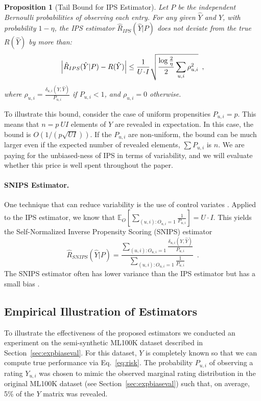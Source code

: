 \documentclass{article}
\newtheorem{proposition}[theorem]{Proposition}
\def\E{{\mathbb{E}}}
\newcommand{\user}{u}                       %
\newcommand{\users}{U}                      %
\newcommand{\movie}{i}                      %
\newcommand{\movies}{I}                     %
\newcommand{\ytrue}{Y}                      %
\newcommand{\ytrueelem}[1]{\ytrue_{#1}}
\newcommand{\ytrueum}{\ytrueelem{\user,\movie}}
\newcommand{\ypred}{\hat{Y}}                %
\newcommand{\loss}[3]{\delta_{#1}(#2,#3)}   %
\newcommand{\lossum}{\loss{\user,\movie}{\ytrue}{\ypred}}
\newcommand{\obs}{O}                        %
\newcommand{\obselem}[1]{\obs_{#1}}
\newcommand{\obsum}{\obselem{\user,\movie}}
\newcommand{\probobs}{P}                    %
\newcommand{\probobselem}[1]{\probobs_{#1}}
\newcommand{\probobsum}{\probobselem{\user,\movie}}
\newcommand{\risk}[1]{R(#1)}                %
\newcommand{\risky}{\risk{\ypred}}
\newcommand{\ipsest}[2]{\hat{R}_{IPS}(#1|#2)}      %
\newcommand{\ipsesty}{\ipsest{\ypred}{\probobs}}
\newcommand{\snipsest}[2]{\hat{R}_{SNIPS}(#1|#2)}  %
\newcommand{\snipsesty}{\snipsest{\ypred}{\probobs}}
\begin{document}
\begin{proposition}[Tail Bound for IPS Estimator]\label{thm:tailbound}
Let $P$ be the independent Bernoulli probabilities of observing each entry. For any given $\ypred$ and $\ytrue$, with probability $1-\eta$, the IPS estimator $\ipsesty$ does not deviate from the true $R(\hat{Y})$ by more than:
\begin{equation}
\left| \ipsesty - \risky \right| \le \frac{1}{\users \!\cdot\! \movies}\sqrt{\frac{\log \frac{2}{\eta}}{2} \sum_{\user,\movie} \rho_{\user,\movie}^2} \enspace , \nonumber
\vspace{-2mm}
\end{equation}
where $\rho_{\user,\movie}=\frac{\lossum}{\probobsum}$ if $\probobsum<1$, and $\rho_{\user,\movie}=0$ otherwise.
\end{proposition}
To illustrate this bound, consider the case of uniform propensities $\probobsum = p$. This means that $n=p\: \users \movies$ elements of $\ytrue$ are revealed in expectation. In this case, the bound is $O(1 / (p \sqrt{\users \movies}) )$. If the $\probobsum$ are non-uniform, the bound can be much larger even if
the expected number of revealed elements, $\sum \probobsum$ is $n$.
We are paying for the unbiased-ness of IPS in terms of variability, and we will evaluate whether this price is well spent throughout the paper.

\paragraph{SNIPS Estimator.} One technique that can reduce variability is the use of control variates \cite{Owen/13}. Applied to the IPS estimator, we know that 
$\E_\obs\left[\sum_{(\user,\movie):\obsum=1} \frac{1}{\probobsum}\right] = \users \cdot \movies$. This yields the Self-Normalized Inverse Propensity Scoring (SNIPS) estimator \cite{Trotter1956,Swaminathan/Joachims/15d}
\begin{equation}
\snipsesty = \frac{\sum_{(\user,\movie):\obsum=1} \frac{\lossum}{\probobsum}}{\sum_{(\user,\movie):\obsum=1} \frac{1}{\probobsum}}\label{eq:snips}\enspace .
\end{equation}
The SNIPS estimator often has lower variance than the IPS estimator but has a small bias \cite{Hesterberg1995}.

\subsection{Empirical Illustration of Estimators} \label{sec:evalillu}
To illustrate the effectiveness of the proposed estimators %
we conducted an experiment on the semi-synthetic ML100K dataset described  in Section~\ref{sec:expbiaseval}. For this dataset, $\ytrue$ is completely known so that we can compute true performance via Eq.~\eqref{eq:risk}. The probability $\probobsum$ of observing a rating $\ytrueum$ was chosen to mimic the observed marginal rating distribution in the original ML100K dataset (see Section~\ref{sec:expbiaseval}) such that, on average, 5\% of the $\ytrue$ matrix was revealed. %
\end{document}
